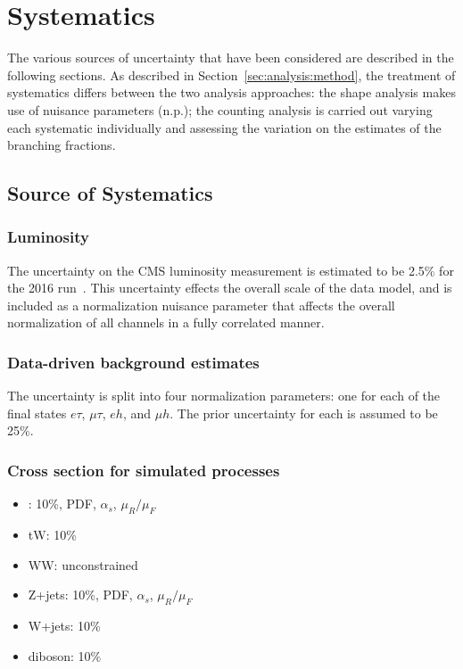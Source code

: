 \section{Systematics}
\label{sec:analysis:systematics}


The various sources of uncertainty that have been considered are
described in the following sections. As described in Section~\ref{sec:analysis:method}, 
the treatment of systematics
differs between the two analysis approaches: the shape analysis makes
use of nuisance parameters (n.p.);
the counting analysis is carried out varying each systematic
individually and assessing the variation on the estimates of the
branching fractions.


\subsection{Source of Systematics}
\subsubsection{Luminosity} 
        
The uncertainty on the CMS luminosity measurement is estimated to be
2.5\% for the 2016 run~\cite{CMS-PAS-LUM-17-001}.  This uncertainty
effects the overall scale of the data model, and is included as a
normalization nuisance parameter that affects the overall normalization of all
channels in a fully correlated manner.


\subsubsection{Data-driven background estimates}

The uncertainty is split into four normalization parameters: one for
each of the final states $e\tau$, $\mu\tau$, $eh$, and $\mu h$.  The
prior uncertainty for each is assumed to be 25\%.

\subsubsection{Cross section for simulated processes}

\begin{itemize}
    \item \ttbar: 10\%, PDF, $\alpha_{s}$, $\mu_{R}/\mu_{F}$
    \item tW: 10\%
    \item WW: unconstrained
    \item Z+jets: 10\%, PDF, $\alpha_{s}$, $\mu_{R}/\mu_{F}$
    \item W+jets: 10\%
    \item diboson: 10\%
\end{itemize}

